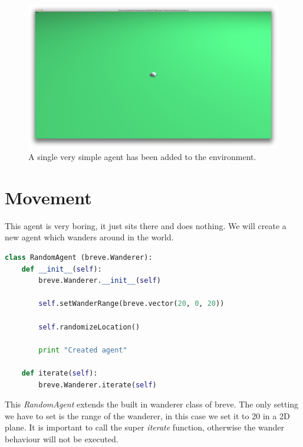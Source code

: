 \begin{figure}[htbp]
\begin{center}
\includegraphics{graphics/simpleagent}
\caption{A single very simple agent has been added to the environment.}
\end{center}
\end{figure}

\section{Movement}
This agent is very boring, it just sits there and does nothing. We will create a new agent which wanders around in the world.

\begin{fullwidth}
\begin{lstlisting}[language=Python]
class RandomAgent (breve.Wanderer):
	def __init__(self):
		breve.Wanderer.__init__(self)

		self.setWanderRange(breve.vector(20, 0, 20))
		
		self.randomizeLocation()
		
		print "Created agent"

	def iterate(self):
		breve.Wanderer.iterate(self)
\end{lstlisting}
\end{fullwidth}


This \textit{RandomAgent} extends the built in wanderer class of breve. The only setting we have to set is the range of the wanderer, in this case we set it to 20 in a 2D plane. It is important to call the super \textit{iterate} function, otherwise the wander behaviour will not be executed.


